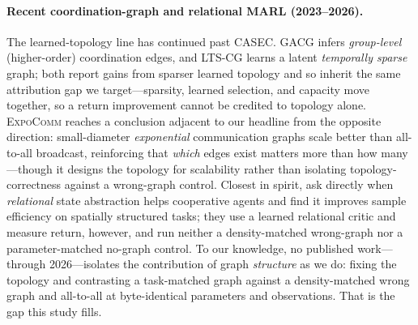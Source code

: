 \documentclass[manuscript, screen, review]{jair}
\providecommand{\citep}{\parencite}
\newcommand{\algoname}[1]{\textsc{#1}}
\begin{document}
\paragraph{Recent coordination-graph and relational MARL (2023--2026).} The
learned-topology line has continued past \algoname{CASEC}. \algoname{GACG}
\citep{duan_2024_gacg} infers \emph{group-level} (higher-order) coordination
edges, and \algoname{LTS-CG} \citep{duan_2024_ltscg} learns a latent
\emph{temporally sparse} graph; both report gains from sparser learned topology
and so inherit the same attribution gap we target---sparsity, learned selection,
and capacity move together, so a return improvement cannot be credited to
topology alone. \algoname{ExpoComm} \citep{li_2025_expocomm} reaches a conclusion
adjacent to our headline from the opposite direction: small-diameter
\emph{exponential} communication graphs scale better than all-to-all broadcast,
reinforcing that \emph{which} edges exist matters more than how many---though it
designs the topology for scalability rather than isolating topology-correctness
against a wrong-graph control. Closest in spirit,
\citet{utke_2025_relabstraction} ask directly when \emph{relational} state
abstraction helps cooperative agents and find it improves sample efficiency on
spatially structured tasks; they use a learned relational critic and measure
return, however, and run neither a density-matched wrong-graph nor a
parameter-matched no-graph control. To our knowledge, no published work---through
2026---isolates the contribution of graph \emph{structure} as we do: fixing the
topology and contrasting a task-matched graph against a density-matched wrong
graph and all-to-all at byte-identical parameters and observations. That is the
gap this study fills.
\end{document}
